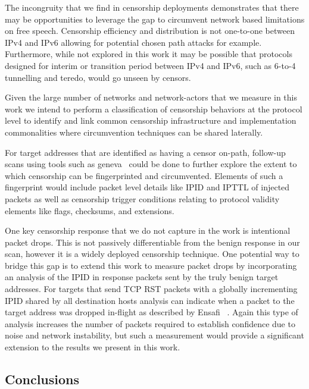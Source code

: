 The incongruity that we find in censorship deployments demonstrates that there
may be opportunities to leverage the gap to circumvent network based limitations
on free speech. Censorship efficiency and distribution is not one-to-one between
IPv4 and IPv6 allowing for potential chosen path attacks for example.
Furthermore, while not explored in this work it may be possible that protocols
designed for interim or transition period between IPv4 and IPv6, such as 6-to-4
tunnelling and teredo, would go unseen by censors.


Given the large number of networks and network-actors that we measure in this
work we intend to perform a classification of censorship behaviors at the
protocol level to identify and link common censorship infrastructure and
implementation commonalities where circumvention techniques can be shared
laterally.

For target addresses that are identified as having a censor on-path, follow-up
scans using tools such as geneva~\cite{bock2019geneva} could be done to further
explore the extent to which censorship can be fingerprinted and circumvented.
Elements of such a fingerprint would include packet level details like IPID and
IPTTL of injected packets as well as censorship trigger conditions relating to
protocol validity elements like flags, checksums, and extensions.


One key censorship response that we do not capture in the work is intentional
packet drops. This is not passively differentiable from the benign response in
our scan, however it is a widely deployed censorship technique. One potential
way to bridge this gap is to extend this work to measure packet drops by
incorporating an analysis of the IPID in response packets sent by the truly
benign target addresses. For targets that send TCP RST packets with a globally
incrementing IPID shared by all destination hosts analysis can indicate when a
packet to the target address was dropped in-flight as described by Ensafi
\etal~\cite{ensafi:detecting}. Again this type of analysis increases the number
of packets required to establish confidence due to noise and network
instability, but such a measurement would provide a significant extension to the
results we present in this work.


\subsection{Conclusions} \label{sec:discussion:conclusions}

